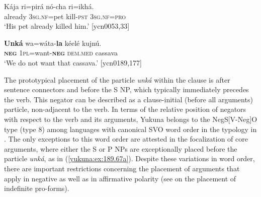 \documentclass[output=paper,colorlinks,citecolor=brown]{langscibook}
\begin{document}
\ea\label{yukuna:ex:53.33a}
\gll Kája 	ri=pirá		nó-cha	ri=ikhá.\\
already \textsc{3sg.nf}=pet kill-\textsc{pst} \textsc{3sg.nf=pro}\\
\glt ‘His pet already killed him.’ [ycn0053,33]
\z

\ea\label{yukuna:ex:189.177}
\gll \textbf{Unká} wa=wáta-\textbf{la} kéelé kujnú. \\
\textbf{\textsc{neg}} \textsc{1pl}=want-\textbf{\textsc{neg}} \textsc{dem.med} cassava \\
\glt ‘We do not want that cassava.’ [ycn0189,177]
\z

The prototypical placement of the particle \textit{unká} within the clause is after sentence connectors and before the S NP, which typically immediately precedes the verb. This negator can be described as a clause-initial (before all arguments) particle, non-adjacent to the verb. In terms of the relative position of negators with respect to the verb and its arguments, Yukuna belongs to the NegS[V-Neg]O type (type 8) among languages with canonical SVO word order in the typology in \citet{Dryer2013-wals144}. The only exceptions to this word order are attested in the focalization of core arguments, where either the S or P NPs are exceptionally placed before the particle \textit{unká}, as in (\ref{yukuna:ex:189.67a}). Despite these variations in word order, there are important restrictions concerning the placement of arguments that apply in negative as well as in affirmative polarity (see  on the placement of indefinite pro-forms).
\end{document}
